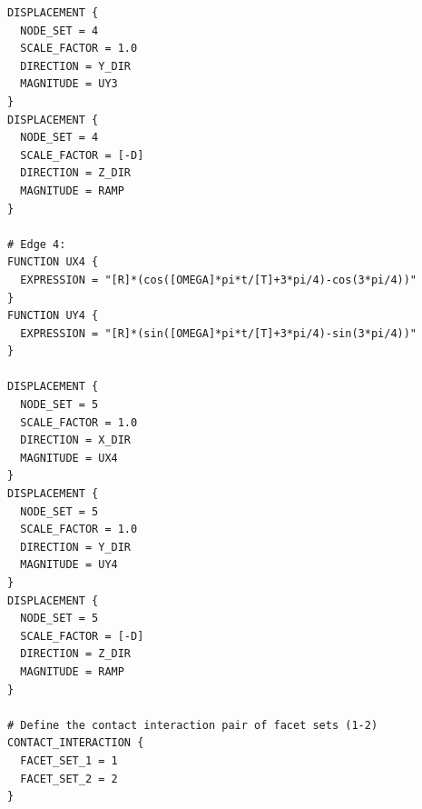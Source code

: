 \documentclass[11pt]{article} %
\begin{document}
\begin{lstlisting}[showstringspaces=false]
DISPLACEMENT {
  NODE_SET = 4
  SCALE_FACTOR = 1.0
  DIRECTION = Y_DIR
  MAGNITUDE = UY3
}
DISPLACEMENT {
  NODE_SET = 4
  SCALE_FACTOR = [-D]
  DIRECTION = Z_DIR
  MAGNITUDE = RAMP
}

# Edge 4:
FUNCTION UX4 {
  EXPRESSION = "[R]*(cos([OMEGA]*pi*t/[T]+3*pi/4)-cos(3*pi/4))"
}
FUNCTION UY4 {
  EXPRESSION = "[R]*(sin([OMEGA]*pi*t/[T]+3*pi/4)-sin(3*pi/4))"
}

DISPLACEMENT {
  NODE_SET = 5
  SCALE_FACTOR = 1.0
  DIRECTION = X_DIR
  MAGNITUDE = UX4
}
DISPLACEMENT {
  NODE_SET = 5
  SCALE_FACTOR = 1.0
  DIRECTION = Y_DIR
  MAGNITUDE = UY4
}
DISPLACEMENT {
  NODE_SET = 5
  SCALE_FACTOR = [-D]
  DIRECTION = Z_DIR
  MAGNITUDE = RAMP
}

# Define the contact interaction pair of facet sets (1-2)
CONTACT_INTERACTION {
  FACET_SET_1 = 1
  FACET_SET_2 = 2
}
\end{lstlisting}
\end{document}
